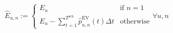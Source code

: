 \begin{equation}
	\hat{E}_{u,n} :=
	\begin{cases}
		E_u &\text{if } n=1\\
		E_u - \sum_{t=1}^{T^\text{sch}} \hat{p}^\text{EV}_{u,n}(t)\Delta t &\text{otherwise}
	\end{cases}
	\forall u, n
	\label{ch3:equ:temporary-charging-demand-expanded}
\end{equation}